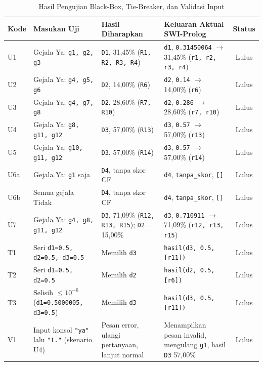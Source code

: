 \documentclass[12pt,a4paper]{report}
\begin{document}
\begin{table}[H]
\centering
\caption{Hasil Pengujian Black-Box, Tie-Breaker, dan Validasi Input}
\label{tab:uji}
\scriptsize
\begin{tabularx}{\textwidth}{l Y Y Y c}
\toprule
\textbf{Kode} & \textbf{Masukan Uji} & \textbf{Hasil Diharapkan} & \textbf{Keluaran Aktual SWI-Prolog} & \textbf{Status} \\
\midrule
U1 & Gejala Ya: \texttt{g1, g2, g3} & \texttt{D1}, 31,45\% (\texttt{R1, R2, R3, R4}) & \texttt{d1}, \texttt{0.31450064} $\rightarrow$ 31,45\% (\texttt{r1, r2, r3, r4}) & Lulus \\
U2 & Gejala Ya: \texttt{g4, g5, g6} & \texttt{D2}, 14,00\% (\texttt{R6}) & \texttt{d2}, \texttt{0.14} $\rightarrow$ 14,00\% (\texttt{r6}) & Lulus \\
U3 & Gejala Ya: \texttt{g4, g7, g8} & \texttt{D2}, 28,60\% (\texttt{R7, R10}) & \texttt{d2}, \texttt{0.286} $\rightarrow$ 28,60\% (\texttt{r7, r10}) & Lulus \\
U4 & Gejala Ya: \texttt{g8, g11, g12} & \texttt{D3}, 57,00\% (\texttt{R13}) & \texttt{d3}, \texttt{0.57} $\rightarrow$ 57,00\% (\texttt{r13}) & Lulus \\
U5 & Gejala Ya: \texttt{g10, g11, g12} & \texttt{D3}, 57,00\% (\texttt{R14}) & \texttt{d3}, \texttt{0.57} $\rightarrow$ 57,00\% (\texttt{r14}) & Lulus \\
U6a & Gejala Ya: \texttt{g1} saja & \texttt{D4}, tanpa skor CF & \texttt{d4}, \texttt{tanpa\_skor}, \texttt{[]} & Lulus \\
U6b & Semua gejala Tidak & \texttt{D4}, tanpa skor CF & \texttt{d4}, \texttt{tanpa\_skor}, \texttt{[]} & Lulus \\
U7 & Gejala Ya: \texttt{g4, g8, g11, g12} & \texttt{D3}, 71,09\% (\texttt{R12, R13, R15}); \texttt{D2} = 15,00\% & \texttt{d3}, \texttt{0.710911} $\rightarrow$ 71,09\% (\texttt{r12, r13, r15}) & Lulus \\
\midrule
T1 & Seri \texttt{d1=0.5, d2=0.5, d3=0.5} & Memilih \texttt{d3} & \texttt{hasil(d3, 0.5, [r11])} & Lulus \\
T2 & Seri \texttt{d1=0.5, d2=0.5} & Memilih \texttt{d2} & \texttt{hasil(d2, 0.5, [r6])} & Lulus \\
T3 & Selisih $\le 10^{-6}$ (\texttt{d1=0.5000005, d3=0.5}) & Memilih \texttt{d3} & \texttt{hasil(d3, 0.5, [r11])} & Lulus \\
V1 & Input konsol \texttt{"ya"} lalu \texttt{"t."} (skenario U4) & Pesan error, ulangi pertanyaan, lanjut normal & Menampilkan pesan invalid, mengulang \texttt{g1}, hasil \texttt{D3} 57,00\% & Lulus \\
\bottomrule
\end{tabularx}
\end{table}
\end{document}
